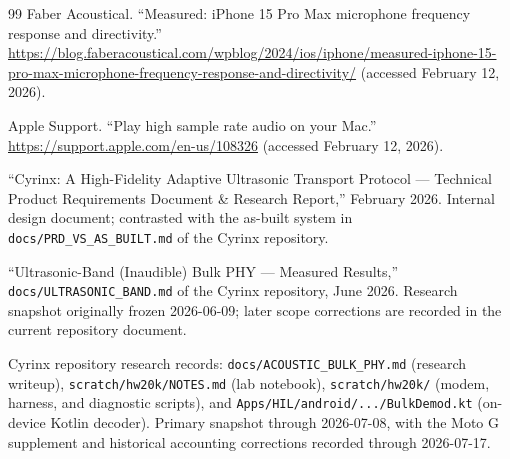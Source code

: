 \documentclass[11pt]{article}
\begin{document}
\begin{thebibliography}{99}
Faber Acoustical. ``Measured: iPhone 15 Pro Max microphone frequency response
and directivity.''
\url{https://blog.faberacoustical.com/wpblog/2024/ios/iphone/measured-iphone-15-pro-max-microphone-frequency-response-and-directivity/}
(accessed February 12, 2026).

Apple Support. ``Play high sample rate audio on your Mac.''
\url{https://support.apple.com/en-us/108326} (accessed February 12, 2026).

``Cyrinx: A High-Fidelity Adaptive Ultrasonic Transport Protocol ---
Technical Product Requirements Document \& Research Report,'' February 2026.
Internal design document; contrasted with the as-built system in
\texttt{docs/PRD\_VS\_AS\_BUILT.md} of the Cyrinx repository.

``Ultrasonic-Band (Inaudible) Bulk PHY --- Measured Results,''
\texttt{docs/ULTRASONIC\_BAND.md} of the Cyrinx repository, June 2026.
Research snapshot originally frozen 2026-06-09; later scope corrections are
recorded in the current repository document.

Cyrinx repository research records: \texttt{docs/ACOUSTIC\_BULK\_PHY.md}
(research writeup), \texttt{scratch/hw20k/NOTES.md} (lab notebook),
\texttt{scratch/hw20k/} (modem, harness, and diagnostic scripts), and
\texttt{Apps/HIL/android/.../BulkDemod.kt} (on-device Kotlin decoder).
Primary snapshot through 2026-07-08, with the Moto G supplement and historical
accounting corrections recorded through 2026-07-17.

\end{thebibliography}
\end{document}
